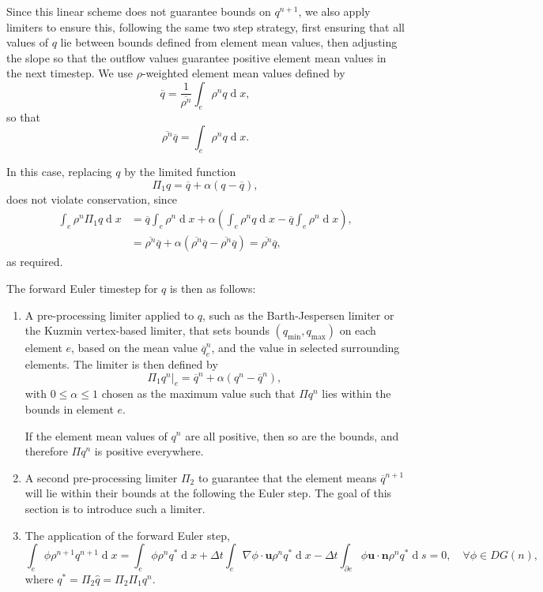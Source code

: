 \documentclass{article}
\def\MM#1{\boldsymbol{#1}}
\def\MM#1{\boldsymbol{#1}}
\DeclareMathOperator{\diff}{d}
\begin{document}
Since this linear scheme does not guarantee bounds on $q^{n+1}$, we
also apply limiters to ensure this, following the same two step
strategy, first ensuring that all values of $q$ lie between bounds
defined from element mean values, then adjusting the slope so that the
outflow values guarantee positive element mean values in the next
timestep. We use $\rho$-weighted element mean values defined by
\begin{equation}
\overline{q} = \frac{1}{\overline{\rho^n}}\int_e \rho^n q \diff x,
\end{equation}
so that
\begin{equation}
\overline{\rho^{n}}\overline{q} = \int_e \rho^n q \diff x.
\end{equation}

In this case, replacing $q$ by the limited function
\begin{equation}
\Pi_1q = \overline{q} + \alpha(q-\overline{q}),
\end{equation}
does not violate conservation, since
\begin{align}
\int_e \rho^n\Pi_1q \diff x &= \overline{q}\int_e \rho^n\diff x + \alpha 
\left(\int_e \rho^nq\diff x-\overline{q}\int_e \rho^n\diff x\right), \\
&= \overline{\rho^n}\overline{q} + \alpha\left(\overline{\rho^n}\overline{q}
-\overline{\rho^n}\overline{q}\right) = \overline{\rho^n}\overline{q},
\end{align}
as required.

The forward Euler timestep for $q$ is then as follows:
\begin{enumerate}
\item A pre-processing limiter applied to $q$, such as the
  Barth-Jespersen limiter or the Kuzmin vertex-based limiter, that
  sets bounds $(q_{\min},q_{\max})$ on each element $e$, based on the
  mean value $\overline{q}^n_e$, and the value in selected surrounding
  elements. The limiter is then defined by
\begin{equation}
\Pi_1q^n|_e = \overline{q}^n + \alpha (q^n - \overline{q}^n),
\end{equation}
with $0\leq \alpha \leq 1$ chosen as the maximum value such that
$\Pi q^n$ lies within the bounds in element $e$.

If the element mean values of $q^n$ are all positive, then so are
the bounds, and therefore $\Pi q^n$ is positive everywhere.
\item A second pre-processing limiter $\Pi_2$ to guarantee that the
  element means $\overline{q}^{n+1}$ will lie within their bounds at the
  following the Euler step. The goal of this section is to introduce
  such a limiter.
\item The application of the forward Euler step,
\begin{equation}
\label{eq:forward euler q}
\int_e \phi\rho^{n+1} q^{n+1} \diff x 
= \int_e \phi \rho^n q^* \diff x 
+ \Delta t \int_e \nabla \phi \cdot\MM{u}\rho^n q^*\diff x
- \Delta t\int_{\partial e} \phi \MM{u}\cdot\MM{n} 
\rho^n q^* \diff s = 0,
\quad \forall \phi \in DG(n),
\end{equation}
where $q^*=\Pi_2\hat{q} = \Pi_2\Pi_1q^n$.
\end{enumerate}
\end{document}
